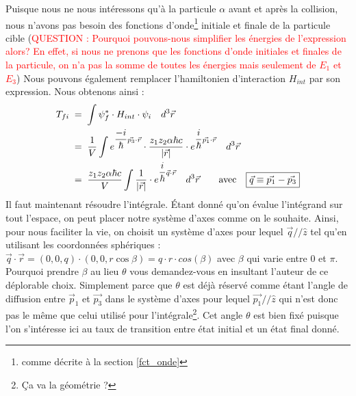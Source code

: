 Puisque nous ne nous intéressons qu'à la particule $\alpha$ avant et après la collision, nous n'avons pas besoin des fonctions d'onde\footnote{comme décrite à la section \ref{fct_onde}} initiale et finale de la particule cible (\textcolor{red}{QUESTION : Pourquoi pouvons-nous simplifier les énergies de l'expression alors? En effet, si nous ne prenons que les fonctions d'onde initiales et finales de la particule, on n'a pas la somme de toutes les énergies mais seulement de $E_1$ et $E_3$})
Nous pouvons également remplacer l'hamiltonien d'interaction $H_{int}$ par son expression. Nous obtenons ainsi :
\begin{align*}
    T_{fi}
        &\; = \;
    \int \psi_f^* \cdot H_{int} \cdot \psi_i \quad d^3\vec{r}\\
        &\; = \;
    \dfrac{1}{V} 
    \int e^{\dfrac{-i}{\hbar}\vec{p_3}\cdot\vec{r}}    \cdot
    \dfrac{z_1 z_2\alpha\hbar c}{|\vec{r}|}                   \cdot
    e^{\dfrac{i}{\hbar}\vec{p_1}\cdot\vec{r}}
    \quad d^3\vec{r}
    \\
        &\; = \;
    \dfrac{z_1 z_2\alpha\hbar c}{V} 
    \int 
    \dfrac{1}{|\vec{r}|} \cdot e^{\dfrac{i}{\hbar}\vec{q}\cdot\vec{r}}
    \quad d^3\vec{r} 
    \qquad \text{avec} \quad \boxed{ \vec{q} \equiv \vec{p_1}-\vec{p_3}}
\end{align*}
Il faut maintenant résoudre l'intégrale. Étant donné qu'on évalue l'intégrand sur tout l'espace, on peut placer notre système d'axes comme on le souhaite. Ainsi, pour nous faciliter la vie, on choisit un système d'axes pour lequel $\vec{q} // \hat{z}$ tel qu'en utilisant les coordonnées sphériques : $\vec{q}\cdot\vec{r} = (0,0,q)\cdot(0,0,r\cos{\beta}) = q\cdot r \cdot cos(\beta)$ avec $\beta$ qui varie entre 0 et $\pi$. Pourquoi prendre $\beta$ au lieu $\theta$ vous demandez-vous en insultant l'auteur de ce déplorable choix. Simplement parce que $\theta$ est déjà réservé comme étant l'angle de diffusion entre $\vec{p}_1$ et $\vec{p_3}$ dans le système d'axes pour lequel $\vec{p_1} // \hat{z}$ qui n'est donc pas le même que celui utilisé pour l'intégrale\footnote{Ça va la géométrie ?}. Cet angle $\theta$ est bien fixé puisque l'on s'intéresse ici au taux de transition entre état initial et un état final donné.\\
